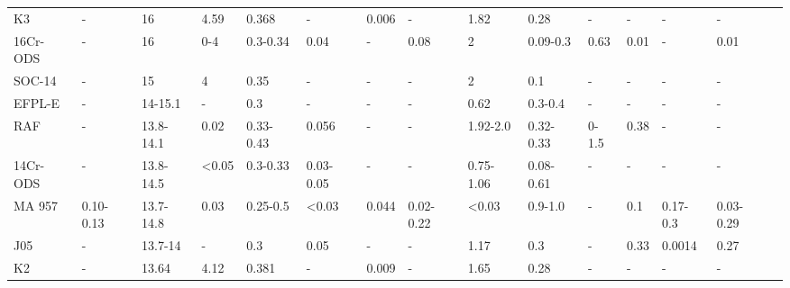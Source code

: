 \begin{sidewaystable}[]
{\begin{tabular}{lllllllllllllll}
K3                    & -           & 16          & 4.59            & 0.368         & -               & 0.006      & -          & 1.82            & 0.28            & -               & -               & -           & -           &\cite{RN606,RN982,RN1014}              \\
16Cr-ODS              & -           & 16          & 0-4             & 0.3-0.34      & 0.04            & -          & 0.08       & 2               & 0.09-0.3        & 0.63            & 0.01            & -           & 0.01        &\cite{RN153}              \\
SOC-14                & -           & 15          & 4               & 0.35          & -               & -          & -          & 2               & 0.1             & -               & -               & -           & -           &\cite{RN153}              \\
EFPL-E                & -           & 14-15.1     & -               & 0.3           & -               & -          & -          & 0.62            & 0.3-0.4         & -               & -               & -           & -           &\cite{RN153,RN1196}              \\
RAF                   & -           & 13.8-14.1   & 0.02            & 0.33-0.43     & 0.056           & -          & -          & 1.92-2.0        & 0.32-0.33       & 0-1.5           & 0.38            & -           & -           &\cite{RN161,RN228}              \\
14Cr-ODS              & -           & 13.8-14.5   & \textless{}0.05 & 0.3-0.33      & 0.03-0.05       & -          & -          & 0.75-1.06       & 0.08-0.61       & -               & -               & -           & -           &\cite{RN1365,RN1367,RN346,RN120,RN51,RN115,RN964,RN596,RN114}              \\
MA 957                & 0.10-0.13   & 13.7-14.8   & 0.03            & 0.25-0.5      & \textless{}0.03 & 0.044      & 0.02-0.22  & \textless{}0.03 & 0.9-1.0         & -               & 0.1             & 0.17-0.3    & 0.03-0.29   &\cite{RN1177,RN913,RN1197,RN1073,RN916,RN99,RN102,RN572,RN2637,RN26,RN119,RN1099}              \\
J05                   & -           & 13.7-14     & -               & 0.3           & 0.05            & -          & -          & 1.17            & 0.3             & -               & 0.33            & 0.0014      & 0.27        &\cite{RN982,RN40}              \\
K2                    & -           & 13.64       & 4.12            & 0.381         & -               & 0.009      & -          & 1.65            & 0.28            & -               & -               & -           & -           &\cite{RN527,RN926}              \\

\end{tabular}}
\end{sidewaystable}
